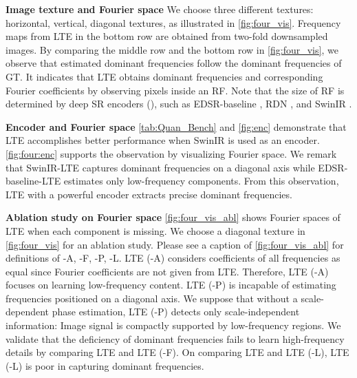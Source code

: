 \documentclass[10pt,twocolumn,letterpaper]{article}
\begin{document}
\textbf{Image texture and Fourier space} We choose three different textures: horizontal, vertical, diagonal textures, as illustrated in \cref{fig:four_vis}. Frequency maps from LTE in the bottom row are obtained from two-fold downsampled images. By comparing the middle row and the bottom row in \cref{fig:four_vis}, we observe that estimated dominant frequencies follow the dominant frequencies of GT. It indicates that LTE obtains dominant frequencies and corresponding Fourier coefficients by observing pixels inside an RF. Note that the size of RF is determined by deep SR encoders (), such as EDSR-baseline \cite{Lim_2017_CVPR_Workshops}, RDN \cite{zhang2018residual}, and SwinIR \cite{liang2021swinir}.

\textbf{Encoder and Fourier space} \cref{tab:Quan_Bench} and \cref{fig:enc} demonstrate that LTE accomplishes better performance when SwinIR \cite{liang2021swinir} is used as an encoder. \cref{fig:four:enc} supports the observation by visualizing Fourier space. We remark that SwinIR-LTE captures dominant frequencies on a diagonal axis while EDSR-baseline-LTE estimates only low-frequency components. From this observation,  LTE with a powerful encoder extracts precise dominant frequencies.

\textbf{Ablation study on Fourier space} \cref{fig:four_vis_abl} shows Fourier spaces of LTE when each component is missing. We choose a diagonal texture in \cref{fig:four_vis} for an ablation study. Please see a caption of \cref{fig:four_vis_abl} for definitions of -A, -F, -P, -L. LTE (-A) considers coefficients of all frequencies as equal since Fourier coefficients are not given from LTE. Therefore, LTE (-A) focuses on learning low-frequency content. LTE (-P) is incapable of estimating frequencies positioned on a diagonal axis. We suppose that without a scale-dependent phase estimation, LTE (-P) detects only scale-independent information: Image signal is compactly supported by low-frequency regions. We validate that the deficiency of dominant frequencies fails to learn high-frequency details by comparing LTE and LTE (-F). On comparing LTE and LTE (-L), LTE (-L) is poor in capturing dominant frequencies.
\end{document}
